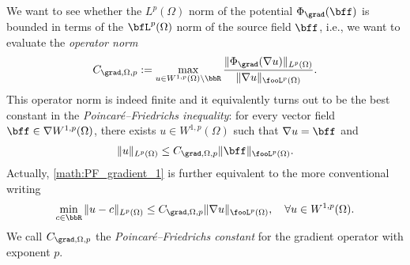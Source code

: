 We want to see whether the $L^{p}(\Omega)$ norm of the potential $\Phi_{\grad}( \bff )$ is bounded in terms of the $\bfL^{p}(\Omega)$ norm of the source field $\bff$, i.e., we want to evaluate the \emph{operator norm}
\begin{align}\label{math:pot_grad_norm}
    C_{\grad,\Omega,p} := \max\limits_{ u \in W^{1,p}(\Omega) \setminus \bbR } 
    \frac{ \| \Phi_{\grad}(\nabla u) \|_{L^{p}(\Omega)} }{ \| \nabla u \|_{\fooL^{p}(\Omega)} }.
\end{align}
This operator norm is indeed finite and it equivalently turns out to be the best constant in the \emph{Poincar\'e--Friedrichs inequality}: for every vector field $\bff \in \nabla W^{1,p}(\Omega)$, there exists $u \in W^{1,p}(\Omega)$ such that $\nabla u = \bff$ and 
\begin{align} \label{math:PF_gradient_1}
    \| u \|_{L^{p}(\Omega)}
    \leq 
    C_{\grad,\Omega,p} 
    \| \bff \|_{\fooL^{p}(\Omega)}.
\end{align}
Actually, \eqref{math:PF_gradient_1} is further equivalent to the more conventional writing
\begin{align} \label{math:PF_gradient_2}
    \min_{ c \in \bbR } \| u - c \|_{L^{p}(\Omega)}
    \leq 
    C_{\grad,\Omega,p}
    \| \nabla u \|_{\fooL^{p}(\Omega)},
    \quad 
    \forall 
    u \in W^{1,p}(\Omega)
    .
\end{align}
We call $C_{\grad,\Omega,p}$ the \emph{Poincar\'e--Friedrichs constant} for the gradient operator with exponent $p$. 











